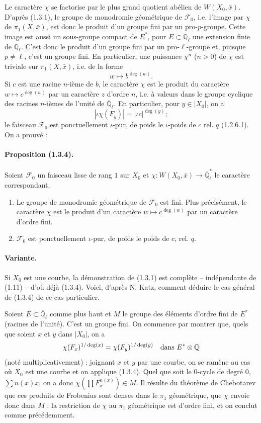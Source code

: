 \documentclass[11pt]{article}
\theoremstyle{remark}
\newcommand{\Ql}{\mathbb{Q}_\ell}
\newcommand{\Qlb}{\overline{\mathbb{Q}}_\ell}
\begin{document}
Le caractère $\chi$ se factorise par le plus grand quotient abélien de $W(X_0,\bar x)$. D'après (1.3.1), le groupe de monodromie géométrique de $\mathcal F_0$, i.e. l'image par $\chi$ de $\pi_1(X,\bar x)$, est donc le produit d'un groupe fini par un pro-$p$-groupe. Cette image est aussi un sous-groupe compact de $E^*$, pour $E\subset\Qlb$ une extension finie de $\Ql$. C'est donc le produit d'un groupe fini par un pro-$\ell$-groupe et, puisque $p\ne\ell$, c'est un groupe fini. En particulier, une puissance $\chi^n$ ($n>0$) de $\chi$ est triviale sur $\pi_1(X,\bar x)$, i.e. de la forme
\[
w\longmapsto b^{\deg(w)}.
\]
Si $c$ est une racine $n$-ième de $b$, le caractère $\chi$ est le produit du caractère $w\mapsto c^{\deg(w)}$ par un caractère $z$ d'ordre $n$, i.e. à valeurs dans le groupe cyclique des racines $n$-ièmes de l'unité de $\Qlb$. En particulier, pour $y\in |X_0|$, on a
\[
|\iota\chi(F_y)|=|\iota c|^{\deg(y)};
\]
le faisceau $\mathcal F_0$ est ponctuellement $\iota$-pur, de poids le $\iota$-poids de $c$ rel. $q$ (1.2.6.1). On a prouvé :

\paragraph{Proposition (1.3.4).} Soient $\mathcal F_0$ un faisceau lisse de rang $1$ sur $X_0$ et $\chi:W(X_0,\bar x)\to\Qlb^*$ le caractère correspondant.
\begin{enumerate}[label=(\roman*)]
\item Le groupe de monodromie géométrique de $\mathcal F_0$ est fini. Plus précisément, le caractère $\chi$ est le produit d'un caractère $w\mapsto c^{\deg(w)}$ par un caractère d'ordre fini.
\item $\mathcal F_0$ est ponctuellement $\iota$-pur, de poids le poids de $c$, rel. $q$.
\end{enumerate}

\paragraph{Variante.} Si $X_0$ est une courbe, la démonstration de (1.3.1) est complète -- indépendante de (1.11) -- d'où déjà (1.3.4). Voici, d'après N. Katz, comment déduire le cas général de (1.3.4) de ce cas particulier.

Soient $E\subset\Qlb$ comme plus haut et $M$ le groupe des éléments d'ordre fini de $E^*$ (racines de l'unité). C'est un groupe fini. On commence par montrer que, quels que soient $x$ et $y$ dans $|X_0|$, on a
\[
\chi(F_x)^{1/\deg(x)}=\chi(F_y)^{1/\deg(y)}\quad\hbox{dans }E^*\otimes\mathbb Q
\]
(noté multiplicativement) : joignant $x$ et $y$ par une courbe, on se ramène au cas où $X_0$ est une courbe et on applique (1.3.4). Quel que soit le $0$-cycle de degré $0$, $\sum n(x)x$, on a donc $\chi(\prod F_x^{n(x)})\in M$. Il résulte du théorème de Chebotarev que ces produits de Frobenius sont denses dans le $\pi_1$ géométrique, que $\chi$ envoie donc dans $M$ : la restriction de $\chi$ au $\pi_1$ géométrique est d'ordre fini, et on conclut comme précédemment.
\end{document}
